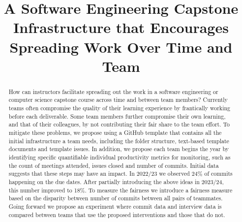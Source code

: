 \documentclass[10pt, conference]{IEEEtran}
\begin{document}
\title{A Software Engineering Capstone Infrastructure that Encourages Spreading
Work Over Time and Team}

\author{\IEEEauthorblockN{}
\IEEEauthorblockA{}


}

\maketitle
  
\begin{abstract}

How can instructors facilitate spreading out the work in a software engineering
or computer science capstone course across time and between team members?
Currently teams often compromise the quality of their learning experience by
frantically working before each deliverable.  Some team members further
compromise their own learning, and that of their colleagues, by not contributing
their fair share to the team effort. To mitigate these problems, we propose
using a GitHub template that contains all the initial infrastructure a team
needs, including the folder structure, text-based template documents and
template issues. In addition, we propose each team begins the year by
identifying specific quantifiable individual productivity metrics for
monitoring, such as the count of meetings attended, issues closed and number of
commits.  Initial data suggests that these steps may have an impact.  In 2022/23
we observed 24\% of commits happening on the due dates.  After partially
introducing the above ideas in 2023/24, this number improved to 18\%.  To
measure the fairness we introduce a fairness measure based on the disparity
between number of commits between all pairs of teammates.  Going forward we
propose an experiment where commit data and interview data is compared between
teams that use the proposed interventions and those that do not.

\end{abstract}
\end{document}
